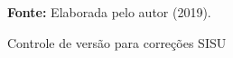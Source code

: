 \begin{figure}[ht!]
\centering

\caption{\textmd{Controle de versão para correções SISU}}
\label{fig:versaosisu}

\par\medskip\textbf{Fonte:} Elaborada pelo autor (2019). \par\medskip

\end{figure}

